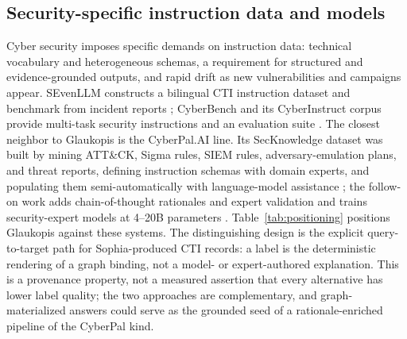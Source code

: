 \documentclass[a4paper,fleqn]{cas-dc}
\begin{document}
\subsection{Security-specific instruction data and models}\label{sec:bg-security}
Cyber security imposes specific demands on instruction data: technical vocabulary and heterogeneous schemas, a requirement for structured and evidence-grounded outputs, and rapid drift as new vulnerabilities and campaigns appear. SEvenLLM constructs a bilingual CTI instruction dataset and benchmark from incident reports \citep{ji2024sevenllm}; CyberBench and its CyberInstruct corpus provide multi-task security instructions and an evaluation suite \citep{liu2024cyberbench}. The closest neighbor to Glaukopis is the CyberPal.AI line. Its SecKnowledge dataset was built by mining ATT\&CK, Sigma rules, SIEM rules, adversary-emulation plans, and threat reports, defining instruction schemas with domain experts, and populating them semi-automatically with language-model assistance \citep{levi2025cyberpal}; the follow-on work adds chain-of-thought rationales and expert validation and trains security-expert models at 4--20B parameters \citep{levi2025toward}. Table~\ref{tab:positioning} positions Glaukopis against these systems. The distinguishing design is the explicit query-to-target path for Sophia-produced CTI records: a label is the deterministic rendering of a graph binding, not a model- or expert-authored explanation. This is a provenance property, not a measured assertion that every alternative has lower label quality; the two approaches are complementary, and graph-materialized answers could serve as the grounded seed of a rationale-enriched pipeline of the CyberPal kind.
\end{document}
